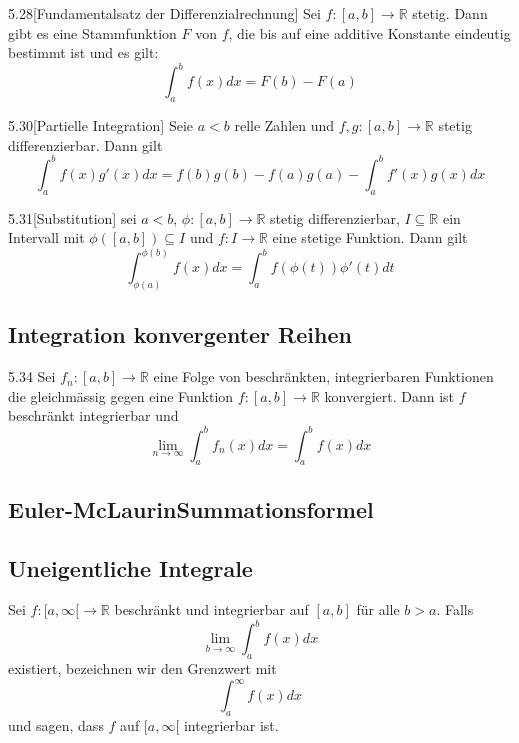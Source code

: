 \documentclass[8pt,a4paper,twocolumn,table]{extarticle}
\newcommand{\R}{\mathbb{R}}
\begin{document}
\begin{satz}{5.28}[Fundamentalsatz der Differenzialrechnung]
    Sei $f: [a,b] \to \R$ stetig. Dann gibt es eine Stammfunktion $F$ von $f$, die bis auf eine additive Konstante eindeutig bestimmt ist und es gilt:
    \[ \int_a^b f(x)dx = F(b) - F(a) \]
\end{satz}

\begin{satz}{5.30}[Partielle Integration]
    Seie $a<b$ relle Zahlen und $f,g: [a,b] \to \R$ stetig differenzierbar. Dann gilt
    \[ \int_a^b f(x)g'(x)dx = f(b)g(b) - f(a)g(a) - \int_a^b f'(x)g(x)dx \]
\end{satz}

\begin{satz}{5.31}[Substitution]
    sei $a < b$, $\phi: [a, b] \to \R$ stetig differenzierbar, $I \subseteq  \R$ ein Intervall mit $\phi([a, b]) \subseteq I$ und $f: I \to \R$ eine stetige Funktion.
    Dann gilt
    \[ \int_{\phi(a)}^{\phi(b)} f(x)dx = \int_a^b f(\phi(t)) \phi'(t) dt \]
\end{satz}

\subsection{Integration konvergenter Reihen}
\begin{satz}{5.34}
    Sei $f_n: [a, b] \to \R$ eine Folge von beschränkten, integrierbaren Funktionen die gleichmässig gegen eine Funktion $f: [a,b] \to \R$ konvergiert.
    Dann ist $f$ beschränkt integrierbar und
    \[ \lim_{n \to \infty} \int_a^b f_n(x)dx = \int_a^b f(x)dx \]
\end{satz}

\subsection{Euler-McLaurinSummationsformel}

\subsection{Uneigentliche Integrale}
\begin{definition}
    Sei $f: [a, \infty[ \to \R$ beschränkt und integrierbar auf $[a,b]$ für alle $b > a$. Falls
    \[ \lim_{b \to \infty} \int_a^b f(x) dx \]
    existiert, bezeichnen wir den Grenzwert mit
    \[ \int_a^\infty f(x)dx \]
    und sagen, dass $f$ auf $[a, \infty[$ integrierbar ist.
\end{definition}
\end{document}
